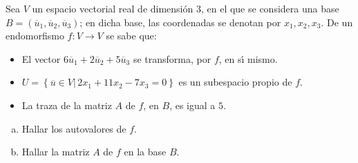 \begin{enunciado}
 Sea $V$ un espacio vectorial real de dimensi\'on $3$, en el que se considera una base $B = (\overline{u}_1, \overline{u}_2, \overline{u}_3)$; en dicha base, las coordenadas se denotan por $x_1, x_2, x_3$.
 De un endomorfismo $f:V \to V$ se sabe que:
 \begin{itemize}
  \item El vector $6\overline{u}_1 + 2\overline{u}_2 + 5\overline{u}_3$ se transforma, por $f$, en s\'{\i} mismo.
  
  \item $U = \left\{ \overline{u}\in V | \, 2x_1 + 11x_2 - 7x_3 = 0 \right\}$ es un subespacio propio de $f$.
  
  \item La traza de la matriz $A$ de $f$, en $B$, es igual a $5$.
 \end{itemize}
 \begin{enumerate}[a)]
  \item Hallar los autovalores de $f$.
  \item Hallar la matriz $A$ de $f$ en la base $B$.
 \end{enumerate}
\end{enunciado}

